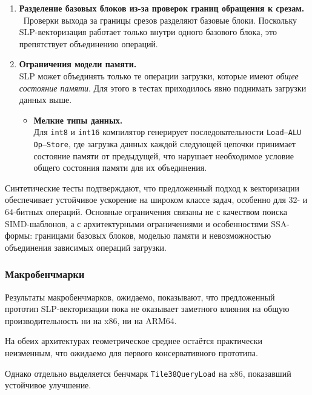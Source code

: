 \begin{enumerate}
\item \textbf{Разделение базовых блоков из-за проверок границ обращения к срезам.} \
Проверки выхода за границы срезов разделяют базовые блоки. 
Поскольку SLP-векторизация работает только внутри одного базового блока, 
это препятствует объединению операций.

\item \textbf{Ограничения модели памяти.} \\
SLP может объединять только те операции загрузки, которые имеют \emph{общее состояние памяти}. 
Для этого в тестах приходилось явно поднимать загрузки данных выше.
\begin{itemize}
    \item \textbf{Мелкие типы данных.} \\
    Для \texttt{int8} и \texttt{int16} компилятор генерирует последовательности \texttt{Load--ALU Op--Store},
    где загрузка данных каждой следующей цепочки принимает состояние памяти от предыдущей, 
    что нарушает необходимое условие общего состояния памяти для их объединения.
\end{itemize}

\end{enumerate}


Синтетические тесты подтверждают, что предложенный подход к векторизации обеспечивает 
устойчивое ускорение на широком классе задач, 
особенно для 32- и 64-битных операций. 
Основные ограничения связаны не с качеством поиска SIMD-шаблонов, 
а с архитектурными ограничениями и особенностями SSA-формы: границами базовых блоков, моделью памяти и
невозможностью объединения зависимых операций загрузки.

\subsubsection{Макробенчмарки}

Результаты макробенчмарков, ожидаемо, показывают, 
что предложенный прототип SLP-векторизации пока не оказывает заметного влияния на общую производительность ни на x86, ни на ARM64.

На обеих архитектурах геометрическое среднее остаётся практически неизменным, 
что ожидаемо для первого консервативного прототипа. 

Однако отдельно выделяется бенчмарк \texttt{Tile38QueryLoad} на x86, 
показавший устойчивое улучшение. 

